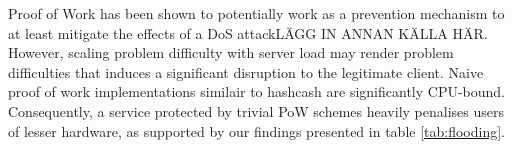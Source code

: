Proof of Work has been shown to potentially work as a prevention mechanism to at least mitigate the effects of a DoS attack\cite{subpuzzles}LÄGG IN ANNAN KÄLLA HÄR. However, scaling problem difficulty with server load may render problem difficulties that induces a significant disruption to the legitimate client. Naive proof of work implementations similair to hashcash are significantly CPU-bound\cite{hashcashbench}. Consequently, a service protected by trivial PoW schemes heavily penalises users of lesser hardware, as supported by our findings presented in table \ref{tab:flooding}.

\begin{comment}
Proof of Work has been shown to potentially work as a prevention mechanism to at least mitigate the effects of a DoS attack without making an as assumption about the source.[källa] However, \citeauthor{LaurieC04} concluded in the paper \citetitle{LaurieC04}, that PoW on it's own, is not a feasible solution to fighting spam and denial of service attacks. This is because the classical implementation of Proof of Work does not seperate legitimate users from attackers. Hence, problems from a Proof of Work protected system would not discourage abusers of the system without having an unacceptable effect on legitimate users. 
\end{comment}